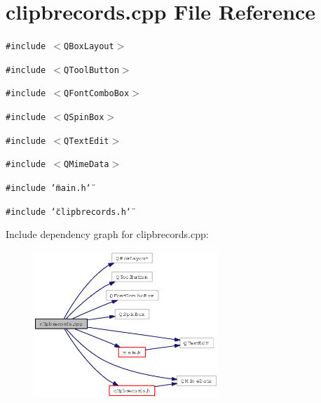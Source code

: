 \section{clipbrecords.cpp File Reference}
\label{clipbrecords_8cpp}
{\tt \#include $<$QBox\-Layout$>$}\par
{\tt \#include $<$QTool\-Button$>$}\par
{\tt \#include $<$QFont\-Combo\-Box$>$}\par
{\tt \#include $<$QSpin\-Box$>$}\par
{\tt \#include $<$QText\-Edit$>$}\par
{\tt \#include $<$QMime\-Data$>$}\par
{\tt \#include \char`\"{}main.h\char`\"{}}\par
{\tt \#include \char`\"{}clipbrecords.h\char`\"{}}\par


Include dependency graph for clipbrecords.cpp:\begin{figure}[H]
\begin{center}
\leavevmode
\includegraphics[width=197pt]{clipbrecords_8cpp__incl}
\end{center}
\end{figure}
